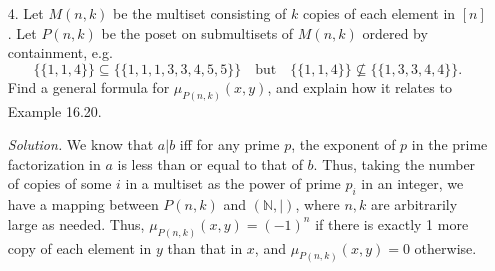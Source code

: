 \documentclass[11pt,letterpaper]{article}
\newenvironment{solution}{\color{blue}\textit{Solution.}}{\color{black}}
\begin{document}
\begin{enumerate}
\item[4.] Let $M(n,k)$ be the multiset consisting of $k$ copies of each element in $[n]$.
Let $P(n,k)$ be the poset on submultisets of $M(n,k)$ ordered by containment, e.g. 
\[
\{\{1,1,4\}\} \subseteq \{\{1,1,1,3,3,4,5,5\}\} \quad \mbox{but} \quad \{\{1,1,4\}\} \not\subseteq \{\{1,3,3,4,4\}\}.
\]
Find a general formula for $\mu_{P(n,k)}(x,y)$, and explain how it relates to Example 16.20.

\begin{solution}
	We know that $a|b$ iff for any prime $p$, the exponent of $p$ in the prime factorization in $a$ is less than or equal to that of $b$. Thus, taking the number of copies of some $i$ in a multiset as the power of prime $p_i$ in an integer, we have a mapping between $P(n,k)$ and $(\mathbb{N},|)$, where $n,k$ are arbitrarily large as needed. Thus, $\mu_{P(n,k)}(x,y)=(-1)^n$ if there is exactly 1 more copy of each element in $y$ than that in $x$, and $\mu_{P(n,k)}(x,y)=0$ otherwise.
\end{solution}


\end{enumerate}
\end{document}
